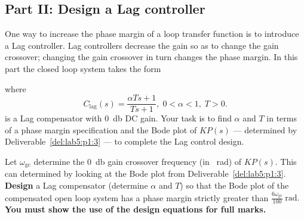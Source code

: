 \subsection{Part II: Design a Lag controller}
One way to increase the phase margin of a loop transfer function is to introduce a Lag controller.
Lag controllers decrease the gain so as to change the gain crossover;
changing the gain crossover in turn changes the phase margin.
In this part the closed loop system takes the form
%
\begin{center}
\end{center}
%
where
\[
  C_\mathrm{lag}(s)
    =
      \frac{\alpha T s + 1}{T s + 1}
  ,
  \;
  0 < \alpha < 1
  ,
  \;
  T > 0.
\]
is a Lag compensator with \SI{0}{\decibel} DC gain.
Your task is to find \(\alpha\) and \(T\) in terms of a phase margin specification and the Bode plot of \(K P(s)\) --- determined by Deliverable~\ref{del:lab5:p1:3} --- to complete the Lag control design.
%
\begin{deliverable}[label={del:lab5:p2:1}]
  Let \(\omega_\mathrm{gc}\) determine the \SI{0}{\decibel} gain crossover frequency (in \SI{}{\radian}) of \(K P(s).\) 
  This can determined by looking at the Bode plot from Deliverable~\ref{del:lab5:p1:3}.
  \textbf{Design} a Lag compensator (determine \(\alpha\) and \(T\)) so that the Bode plot of the compensated open loop system has a phase margin strictly greater than \(\frac{6\omega_\mathrm{gc}}{100}~\mathrm{rad}.\)
  \textbf{You must show the use of the design equations for full marks.}
\end{deliverable}
